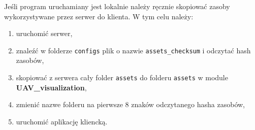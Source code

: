 \documentclass[15pt]{sprawozdanie}
\begin{document}
Jeśli program uruchamiany jest lokalnie należy ręcznie skopiować zasoby wykorzystywane przez serwer do klienta. W tym celu należy:
\begin{enumerate}
\item uruchomić serwer,
\item znaleźć w folderze \texttt{configs} plik o nazwie \texttt{assets\_checksum} i odczytać hash zasobów,
\item skopiować z serwera cały folder \texttt{assets} do folderu \texttt{assets} w module\\ \textbf{UAV\_visualization},
\item zmienić nazwe folderu na pierwsze 8 znaków odczytanego hasha zasobów,
\item uruchomić aplikację kliencką.
\end{enumerate}
\end{document}
